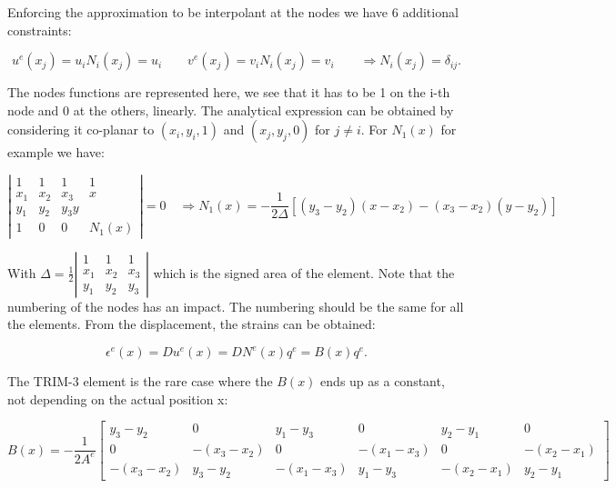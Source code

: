 	Enforcing the approximation to be interpolant at the nodes we have 6 additional constraints: 
	
	\begin{equation}
	u^e(x_j) = u_i N_i (x_j) = u_i \qquad v^e(x_j) = v_i N_i (x_j) = v_i \qquad \Rightarrow N_i (x_j) = \delta _{ij}.
	\end{equation}
	
	The nodes functions are represented here, we see that it has to be 1 on the i-th node and 0 at the others, linearly. The analytical expression can be obtained by considering it co-planar to $(x_i,y_i, 1)$ and $(x_j,y_j, 0)$ for $j\neq i$. For $N_1(x)$ for example we have: 
	
	\begin{equation}
	\left|
	\begin{array}{cccc}
	1 & 1 & 1 & 1\\
	x_1 & x_2 & x_3 & x\\
	y_1 & y_2 &y_3 y\\
	1 & 0 & 0 & N_1(x)
	\end{array}
	\right|
	=0
	\quad \Rightarrow 
	N_1(x) = - \frac{1}{2\Delta} [(y_3 - y_2) (x-x_2) - (x_3 - x_2)(y-y_2)]
	\end{equation}
	
	With $\Delta = \frac{1}{2} \left| \begin{array}{ccc}
	1 & 1 & 1\\
	x_1 & x_2 & x_3\\
	y_1 & y_2 &y_3
\end{array}	 \right|$ which is the signed area of the element. Note that the numbering of the nodes has an impact. The numbering should be the same for all the elements. From the displacement, the strains can be obtained:

	\begin{equation}
	\epsilon ^e (x) = Du^e(x) = DN^e(x) q^e = B(x) q^e.
	\end{equation}
	
	The TRIM-3 element is the rare case where the $B(x)$ ends up as a constant, not depending on the actual position x:
	
	\begin{equation}
	B(x) = -\frac{1}{2A^e} \left[
	\begin{array}{cccccc}
	y_3 -y_2 & 0 & y_1-y_3 & 0 & y_2-y_1 & 0\\
	0 & -(x_3-x_2) & 0 & -(x_1-x_3) & 0 & -(x_2-x_1)\\
	-(x_3-x_2) & y_3 -y_2 & -(x_1-x_3) & y_1-y_3 & -(x_2-x_1) & y_2-y_1
	\end{array}
	\right]
	\end{equation}
	
